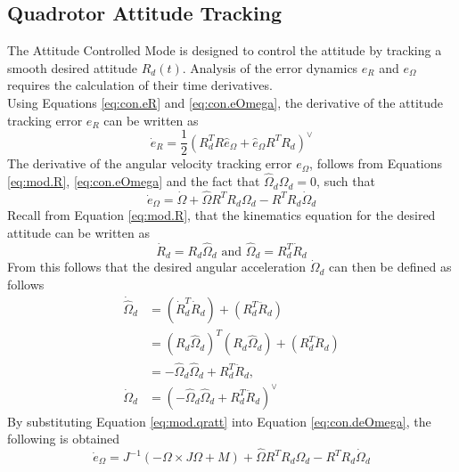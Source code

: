 \subsection{Quadrotor Attitude Tracking}\label{sec:con.qratt}
The  Attitude Controlled Mode is designed to control the  attitude by tracking a smooth desired  attitude $ R_d(t) $.  
Analysis of the error dynamics $ e_R $ and $ e_\Omega $ requires the calculation of their time derivatives.\\
Using Equations \ref{eq:con.eR} and \ref{eq:con.eOmega}, the derivative of the attitude tracking error $ e_R $ can be written as
\begin{equation}\label{key}
\dot{e}_R=\frac{1}{2}(R_d^TR\hat{e}_\Omega+\hat{e}_\Omega R^TR_d)^\vee
\end{equation}
The derivative of the angular velocity tracking error $ e_\Omega $, follows from Equations \ref{eq:mod.R}, \ref{eq:con.eOmega} and the fact that $ \hat{\Omega}_d\Omega_d =0$, such that
\begin{equation}\label{eq:con.deOmega}
\dot{e}_\Omega=\dot{\Omega}+\hat{\Omega}R^TR_d\Omega_d-R^TR_d\dot{\Omega}_d
\end{equation}
Recall from Equation \ref{eq:mod.R}, that the kinematics equation for the desired attitude can be written as
\begin{equation}\label{eq:con.dotRd}
\dot{R}_d=R_d\hat{\Omega}_d \text{ and } \hat{\Omega}_d=R_d^T\dot{R}_d
\end{equation}
From this follows that the desired angular acceleration $ \dot{\Omega}_d $ can then be defined as follows
\begin{equation}
\begin{aligned}
\dot{\hat{\Omega}}_d&=(\dot{R}_d^T\dot{R}_d)+(R_d^T\ddot{R}_d)\\
&=(R_d\hat{\Omega}_d)^T(R_d\hat{\Omega}_d)+(R_d^T\ddot{R}_d)\\
&=-\hat{\Omega}_d\hat{\Omega}_d+R_d^T\ddot{R}_d,\\
\dot{\Omega}_d&=(-\hat{\Omega}_d\hat{\Omega}_d+R_d^T\ddot{R}_d)^\vee \label{eq:con.dOmegad}
\end{aligned}
\end{equation}
By substituting Equation \ref{eq:mod.qratt} into Equation \ref{eq:con.deOmega}, the following is obtained
\begin{equation}\label{eq:con.dOmega}
\dot{e}_\Omega=J^{-1}(-\Omega\times J\Omega + M)+\hat{\Omega}R^TR_d\Omega_d-R^TR_d\dot{\Omega}_d
\end{equation}
